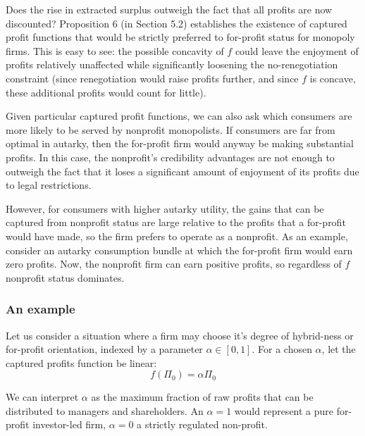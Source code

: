 \documentclass[11pt,english]{article}
\theoremstyle{plain}
\theoremstyle{definition}
\begin{document}
Does the rise in extracted surplus outweigh the fact that all profits
are now discounted? Proposition 6 (in Section 5.2) establishes the
existence of captured profit functions that would be strictly preferred
to for-profit status for monopoly firms. This is easy to see: the
possible concavity of $f$ could leave the enjoyment of profits relatively
unaffected while significantly loosening the no-renegotiation constraint
(since renegotiation would raise profits further, and since $f$ is
concave, these additional profits would count for little).

Given particular captured profit functions, we can also ask which
consumers are more likely to be served by nonprofit monopolists. If
consumers are far from optimal in autarky, then the for-profit firm
would anyway be making substantial profits. In this case, the nonprofit's
credibility advantages are not enough to outweigh the fact that it
loses a significant amount of enjoyment of its profits due to legal
restrictions. 

However, for consumers with higher autarky utility, the gains that
can be captured from nonprofit status are large relative to the profits
that a for-profit would have made, so the firm prefers to operate
as a nonprofit. As an example, consider an autarky consumption bundle
at which the for-profit firm would earn zero profits. Now, the nonprofit
firm can earn positive profits, so regardless of $f$ nonprofit status
dominates.

\subsubsection{An example}

Let us consider a situation where a firm may choose it's degree
of hybrid-ness or for-profit orientation, indexed by a parameter $\alpha\in\left[0,1\right]$.
For a chosen $\alpha$, let the captured profits function be linear:
\begin{equation}
f\left(\Pi_{0}\right)=\alpha\Pi_{0}
\end{equation}


We can interpret $\alpha$ as the maximum fraction of raw
profits that can be distributed to managers and shareholders. An $\alpha=1$
would represent a pure for-profit investor-led firm, $\alpha=0$ a
strictly regulated non-profit.
\end{document}
